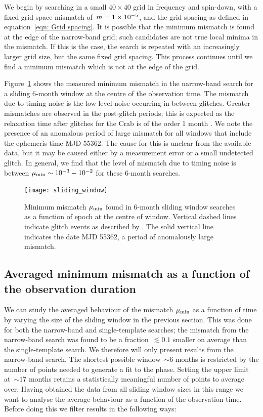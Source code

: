 \documentclass[../full_thesis/full_thesis.tex]{subfiles}
\begin{document}
We begin by searching in a small
$40\times40$ grid in frequency and spin-down, with a fixed grid space
mismatch of~$m=1\times10^{-5}$, and the grid spacing as defined in
equation~\eqref{eqn: Grid spacing}. It is possible that the minimum mismatch is
found at the edge of the narrow-band grid; such candidates  are not true local
minima in the mismatch. If this is the case, the search is repeated with an
increasingly larger grid size, but the same fixed grid spacing.  This process
continues until we find a minimum mismatch which is not at the edge of the
grid.

Figure~\ref{fig: sliding window} shows the measured minimum mismatch in the
narrow-band search for a sliding 6-month window at the centre of the
observation time. The mismatch due to timing noise is the low level noise
occurring in between glitches. Greater mismatches are observed in the
post-glitch periods; this is expected as the relaxation time after glitches for
the Crab is of the order 1 month \citep{Lyne2012book}.  We note the presence of
an anomalous period of large mismatch for all  windows that include the
ephemeris time MJD 55362. The cause for this is unclear from the available
data, but it may be caused either by a measurement error or a small undetected
glitch. In general, we find that the level of mismatch due to timing noise is
between $\mu_{\mathrm{min}} \sim 10^{-3} - 10^{-2}$ for these 6-month searches.

\begin{figure}[htb]
\centering
\texttt{[image: sliding\_window]}
\caption{Minimum mismatch $\mu_{\mathrm{min}}$ found in 6-month sliding window searches
    as a function of epoch
     at the centre of  window.  Vertical dashed lines
    indicate glitch events as described by \citet{Espinoza2011}. The solid
    vertical line indicates the date MJD 55362, a period of anomalously
    large mismatch.}
\label{fig: sliding window}
\end{figure}



\subsection{Averaged minimum mismatch as a function of the observation duration}
\label{sec: averaged mismatch as a function of the observation duration}

We can study the averaged behaviour of the mismatch $\mu_{\mathrm{min}}$ as a function of
time by varying the size of the sliding window in the previous section. This
was done for both the narrow-band and single-template searches; the mismatch
from the narrow-band search was found to be  a fraction~$\lesssim 0.1$ smaller
on average than the single-template search. We therefore will only present
results from the narrow-band search. The shortest possible window~$\sim 6$
months is restricted by the number of points needed to generate a fit to the
phase.  Setting the upper limit at~$\sim 17$ months retains a statistically
meaningful number of points to average over. Having obtained the data from all
sliding window sizes in this range we want to analyse the average behaviour as
a function of the observation time. Before doing this we filter results in the
following ways:
\end{document}
